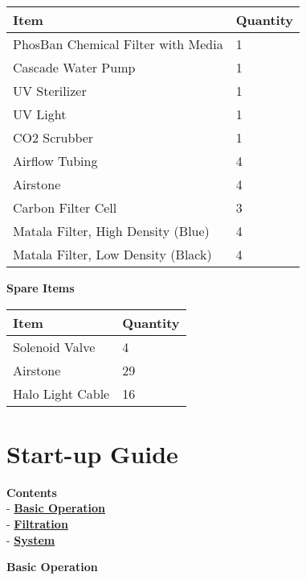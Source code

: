 \documentclass[]{book}
\begin{document}
\begin{longtable}[]{@{}ll@{}}
\toprule
Item & Quantity\tabularnewline
\midrule
\endhead
PhosBan Chemical Filter with Media & 1\tabularnewline
Cascade Water Pump & 1\tabularnewline
UV Sterilizer & 1\tabularnewline
UV Light & 1\tabularnewline
CO2 Scrubber & 1\tabularnewline
Airflow Tubing & 4\tabularnewline
Airstone & 4\tabularnewline
Carbon Filter Cell & 3\tabularnewline
Matala Filter, High Density (Blue) & 4\tabularnewline
Matala Filter, Low Density (Black) & 4\tabularnewline
\bottomrule
\end{longtable}

 \textbf{Spare Items}

\begin{longtable}[]{@{}ll@{}}
\toprule
Item & Quantity\tabularnewline
\midrule
\endhead
Solenoid Valve & 4\tabularnewline
Airstone & 29\tabularnewline
Halo Light Cable & 16\tabularnewline
\bottomrule
\end{longtable}

\chapter{Start-up Guide}\label{start-up-guide}

\textbf{Contents}\\
- \protect\hyperlink{Basic_Operation}{\textbf{Basic Operation}}\\
- \protect\hyperlink{Filtration}{\textbf{Filtration}}\\
- \protect\hyperlink{System}{\textbf{System}}

 \textbf{Basic Operation}
\end{document}
